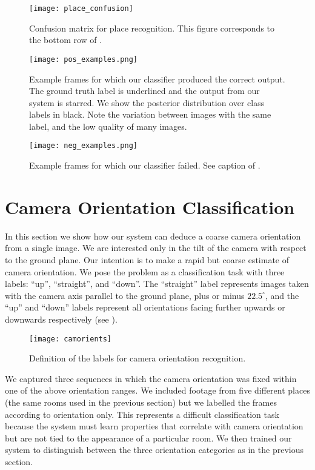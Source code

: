 \begin{figure}[htp]
  \centering
  \texttt{[image: place\_confusion]}
  \caption{Confusion matrix for place recognition. This figure
    corresponds to the bottom row of .}
  \label{fig:place-confusion}
\end{figure}

\begin{figure*}[htp]
\centering
\texttt{[image: pos\_examples.png]}
\caption{Example frames for which our classifier produced the correct
  output. The ground truth label is underlined and the output from our
  system is starred. We show the posterior distribution over class
  labels in black. Note the variation between images with the same
  label, and the low quality of many images.}
\label{fig:pos-examples}
\end{figure*}

\begin{figure*}[htp]
\centering
\texttt{[image: neg\_examples.png]}
\caption{Example frames for which our classifier failed. See caption
  of .}
\label{fig:neg-examples}
\end{figure*}

\section{Camera Orientation Classification}
\label{sec:camera-orientation}
In this section we show how our system can deduce a coarse camera
orientation from a single image. We are interested only in the tilt of
the camera with respect to the ground plane. Our intention is to make
a rapid but coarse estimate of camera orientation. We pose the problem
as a classification task with three labels: ``up'', ``straight'', and
``down''. The ``straight'' label represents images taken with the
camera axis parallel to the ground plane, plus or minus
$22.5^{\circ}$, and the ``up'' and ``down'' labels represent all
orientations facing further upwards or downwards respectively (see
).

\begin{figure}[htp]
  \centering
  \texttt{[image: camorients]}
  \caption{Definition of the labels for camera orientation recognition.}
  \label{fig:camorients}
\end{figure}

We captured three sequences in which the camera orientation was fixed
within one of the above orientation ranges. We included footage from
five different places (the same rooms used in the previous section) but
we labelled the frames according to orientation only. This represents
a difficult classification task because the system must learn
properties that correlate with camera orientation but are not tied to
the appearance of a particular room. We then trained our system to
distinguish between the three orientation categories as in the
previous section.

